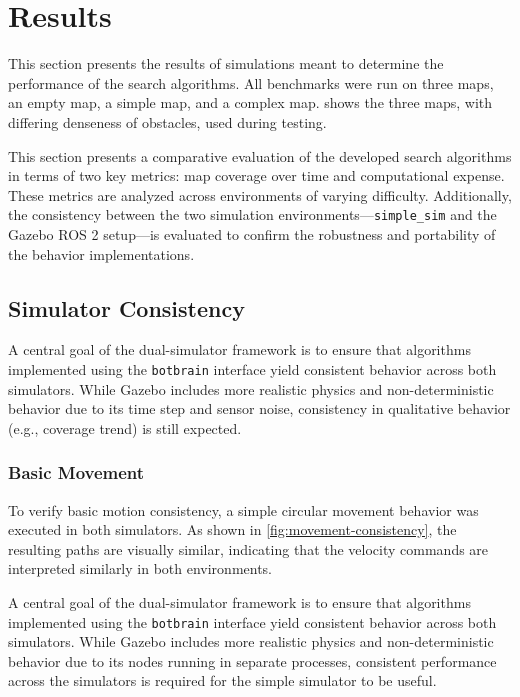 
\section{Results}
\label{sec:results}
This section presents the results of simulations meant to determine the performance of the search algorithms. All benchmarks were run on three maps, an empty map, a simple map, and a complex map.  shows the three maps, with differing denseness of obstacles, used during testing.

This section presents a comparative evaluation of the developed search algorithms in terms of two key metrics: map coverage over time and computational expense. These metrics are analyzed across environments of varying difficulty. 
Additionally, the consistency between the two simulation environments—\texttt{simple\_sim} and the Gazebo ROS 2 setup—is evaluated to confirm the robustness and portability of the behavior implementations.


\subsection{Simulator Consistency}
A central goal of the dual-simulator framework is to ensure that algorithms implemented using the \texttt{botbrain} interface yield consistent behavior across both simulators. While Gazebo includes more realistic physics and non-deterministic behavior due to its time step and sensor noise, consistency in qualitative behavior (e.g., coverage trend) is still expected.


\subsubsection{Basic Movement}
To verify basic motion consistency, a simple circular movement behavior was executed in both simulators. As shown in \cref{fig:movement-consistency}, the resulting paths are visually similar, indicating that the velocity commands are interpreted similarly in both environments.

A central goal of the dual-simulator framework is to ensure that algorithms implemented using the \texttt{botbrain} interface yield consistent behavior across both simulators. While Gazebo includes more realistic physics and non-deterministic behavior due to its nodes running in separate processes, consistent performance across the simulators is {\color{red} required for the simple simulator to be useful}.

